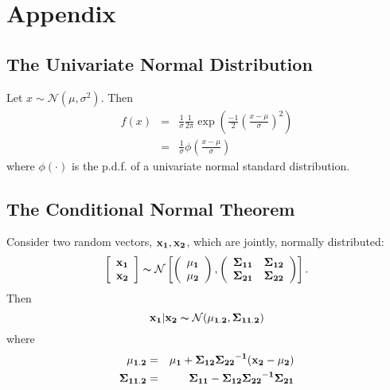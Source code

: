 \renewcommand{\thesection}{\Alph{section}}
\setcounter{section}{0}
\section{Appendix} \label{section:appendix}

\subsection{The Univariate Normal Distribution} \label{section:uninormal}
Let $x \sim \mathcal{N} \left( \mu, \sigma^2 \right)$. Then
\begin{eqnarray}
f(x) &=& \frac{1}{\sigma} \frac{1}{2\pi} \exp \left( \frac{-1}{2} \left( \frac{x - \mu}{\sigma} \right)^2 \right) \nonumber \\
     &=& \frac{1}{\sigma} \phi \left( \frac{x - \mu}{\sigma} \right) 
\end{eqnarray}
\noindent where $\phi(\cdot)$ is the p.d.f. of a univariate normal standard distribution.

\subsection{The Conditional Normal Theorem} \label{section:conditional}
Consider two random vectors, $\bf{x_{1}}, \bf{x_{2}}$, which are jointly, normally distributed:
\begin{equation}
\left[ \begin{array}{c}
\bf{x_{1}} \\
\bf{x_{2}} 
\end{array} \right]
\thicksim \mathcal{N}
\left[ \left( \begin{array}{c}
\bf{\mu_{1}} \\
\bf{\mu_{2}} 
\end{array} \right)
,
\left( \begin{array}{cc}
\bf{\Sigma_{11}} & \bf{\Sigma_{12}}  \\
\bf{\Sigma_{21}} & \bf{\Sigma_{22}}
\end{array} \right) \right]. 
\end{equation}
\noindent Then
\begin{equation}
\bf{x_{1}} | \bf{x_{2}} \thicksim \mathcal{N} (\bf{\mu_{1.2}},\bf{\Sigma_{11.2}})
\end{equation}
where
\begin{eqnarray}
\bf{\mu_{1.2}}     &=& \bf{\mu_{1}} + \bf{\Sigma_{12}}{\bf{\Sigma_{22}}}^{-1}(\bf{x_{2}}-\mu_{2}) \\
\bf{\Sigma_{11.2}} &=& \bf{\Sigma_{11}}   - \bf{\Sigma_{12}}{\bf{\Sigma_{22}}}^{-1}\bf{\Sigma_{21}}
\end{eqnarray}